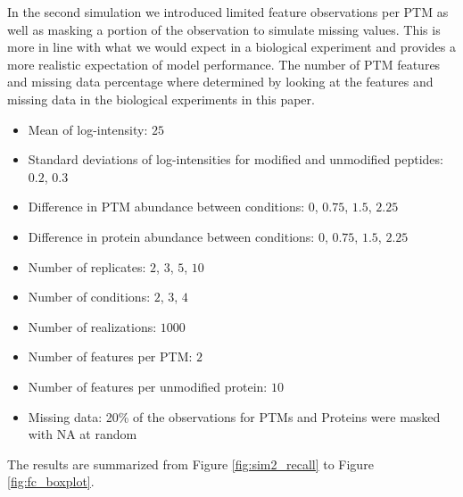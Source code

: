 \documentclass{mcp}
\begin{document}
In the second simulation we introduced limited feature observations per PTM as well as masking a portion of the observation to simulate missing values. This is more in line with what we would expect in a biological experiment and provides a more realistic expectation of model performance. The number of PTM features and missing data percentage where determined by looking at the features and missing data in the biological experiments in this paper.

\begin{itemize}
\item Mean of log-intensity: $25$
\item Standard deviations of log-intensities for modified and unmodified peptides: $0.2$, $0.3$
\item Difference in PTM abundance between conditions: $0$, $0.75$, $1.5$, $2.25$
\item Difference in protein abundance between conditions: $0$, $0.75$, $1.5$, $2.25$
\item Number of replicates: $2$, $3$, $5$, $10$
\item Number of conditions: $2$, $3$, $4$
\item Number of realizations: $1000$
\item Number of features per PTM: $2$
\item Number of features per unmodified protein: $10$
\item Missing data: 20\% of the observations for PTMs and Proteins were masked with NA at random
\end{itemize}

The results are summarized from Figure \ref{fig:sim2_recall} to Figure \ref{fig:fc_boxplot}.
\end{document}
